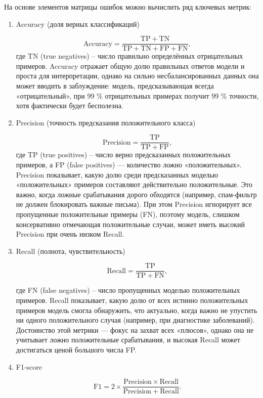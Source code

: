 \documentclass[14pt,a4paper,oneside,openany]{extbook}
\begin{document}
На основе элементов матрицы ошибок можно вычислить ряд ключевых метрик:

\begin{enumerate}
\item Accuracy (доля верных классификаций)

$$
   \mathrm{Accuracy} = \frac{\mathrm{TP} + \mathrm{TN}}{\mathrm{TP} + \mathrm{TN} + \mathrm{FP} + \mathrm{FN}},
   $$
где TN (true negatives) -- число правильно определённых отрицательных примеров. Accuracy отражает общую долю правильных ответов модели и проста для интерпретации, однако на сильно несбалансированных данных она может вводить в заблуждение: модель, предсказывающая всегда «отрицательный», при 99 \% отрицательных примерах получит 99 \% точности, хотя фактически будет бесполезна.

\item Precision (точность предсказания положительного класса)

$$
   \mathrm{Precision} = \frac{\mathrm{TP}}{\mathrm{TP} + \mathrm{FP}},
   $$
где TP (true positives) -- число верно предсказанных положительных примеров, а FP (false positives) — количество ложно «положительных». Precision показывает, какую долю среди предсказанных моделью «положительных» примеров составляют действительно положительные. Это важно, когда ложные срабатывания дорого обходятся (например, спам-фильтр не должен блокировать важные письма). При этом Precision игнорирует все пропущенные положительные примеры (FN), поэтому модель, слишком консервативно отмечающая положительные случаи, может иметь высокий Precision при очень низком Recall.

\item Recall (полнота, чувствительность)

$$
   \mathrm{Recall} = \frac{\mathrm{TP}}{\mathrm{TP} + \mathrm{FN}},
   $$

где FN (false negatives) -- число пропущенных моделью положительных примеров. Recall показывает, какую долю от всех истинно положительных примеров модель смогла обнаружить, что актуально, когда важно не упустить ни одного положительного случая (например, при диагностике заболеваний). Достоинство этой метрики — фокус на захват всех «плюсов», однако она не учитывает ложно положительные срабатывания, и высокая Recall может достигаться ценой большого числа FP.

\item F1-score

$$
   \mathrm{F1} = 2 \times \frac{\mathrm{Precision} \times \mathrm{Recall}}{\mathrm{Precision} + \mathrm{Recall}}.
   $$


\end{enumerate}
\end{document}
